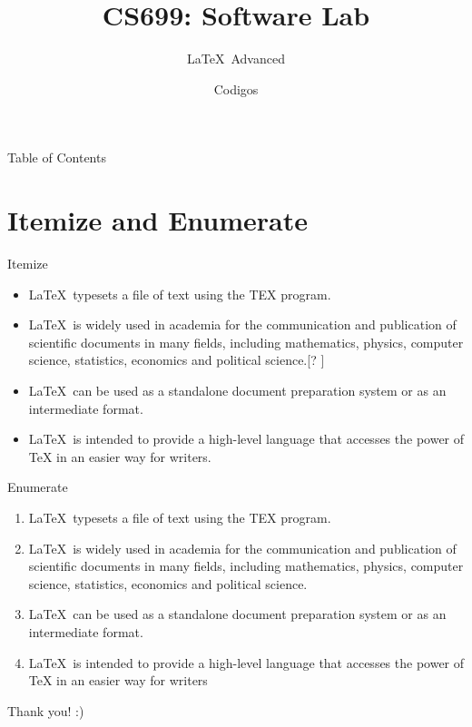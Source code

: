 \documentclass{beamer}
\title{CS699: Software Lab}
\subtitle{\LaTeX\, Advanced}
\author{Codigos \break 193050021 \break 193050028 \break 193050040 \break}
\institute{Indian Institute of Technology, Bombay}
\begin{document}
\begin{frame}
  \titlepage
\end{frame}

\begin{frame}{Table of Contents}
 \tableofcontents
\end{frame}

\section{Itemize and Enumerate}
\begin{frame}{Itemize}

\begin{itemize}
    \item \LaTeX \, typesets a file of text using the TEX program.
    \item \LaTeX \, is widely used in academia for the communication and
    publication of scientific documents in many fields, including
    mathematics, physics, computer science, statistics, economics and
    political science.[? ]
    \item \LaTeX \, can be used as a standalone document preparation system or as
    an intermediate format.
    \item \LaTeX \, is intended to provide a high-level language that accesses the
    power of TeX in an easier way for writers.
\end{itemize}
\end{frame}


\begin{frame}{Enumerate}

\begin{enumerate}
\item \LaTeX \, typesets a file of text using the TEX program.
\item \LaTeX \, is widely used in academia for the communication and
publication of scientific documents in many fields, including
mathematics, physics, computer science, statistics, economics and
political science.
\item \LaTeX \, can be used as a standalone document preparation system or
as an intermediate format.
\item \LaTeX \, is intended to provide a high-level language that accesses the
power of TeX in an easier way for writers
\end{enumerate}

\end{frame}

{
\begin{frame}
    \begin{center}
    \Huge Thank you! :)
    \end{center}
\end{frame}
}
\end{document}
